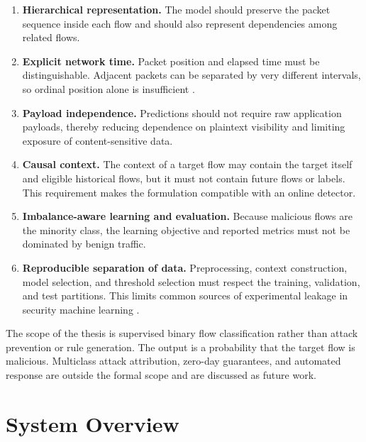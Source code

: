 \documentclass[11pt,fleqn]{report}
\begin{document}
\begin{enumerate}[label=\textbf{R\arabic*:},leftmargin=*]
    \item \textbf{Hierarchical representation.} The model should preserve the
    packet sequence inside each flow and should also represent dependencies
    among related flows.

    \item \textbf{Explicit network time.} Packet position and elapsed time must
    be distinguishable. Adjacent packets can be separated by very different
    intervals, so ordinal position alone is insufficient
    \cite{Han2023GTID}.

    \item \textbf{Payload independence.} Predictions should not require raw
    application payloads, thereby reducing dependence on plaintext visibility
    and limiting exposure of content-sensitive data.

    \item \textbf{Causal context.} The context of a target flow may contain the
    target itself and eligible historical flows, but it must not contain future
    flows or labels. This requirement makes the formulation compatible with an
    online detector.

    \item \textbf{Imbalance-aware learning and evaluation.} Because malicious
    flows are the minority class, the learning objective and reported metrics
    must not be dominated by benign traffic.

    \item \textbf{Reproducible separation of data.} Preprocessing, context
    construction, model selection, and threshold selection must respect the
    training, validation, and test partitions. This limits common sources of
    experimental leakage in security machine learning
    \cite{Arp2022DosDonts,Ring2019Datasets}.
\end{enumerate}

The scope of the thesis is supervised binary flow classification rather than
attack prevention or rule generation. The output is a probability that the
target flow is malicious. Multiclass attack attribution, zero-day guarantees,
and automated response are outside the formal scope and are discussed as future
work.

\section{System Overview}
\label{subsec:system_overview}
\end{document}
